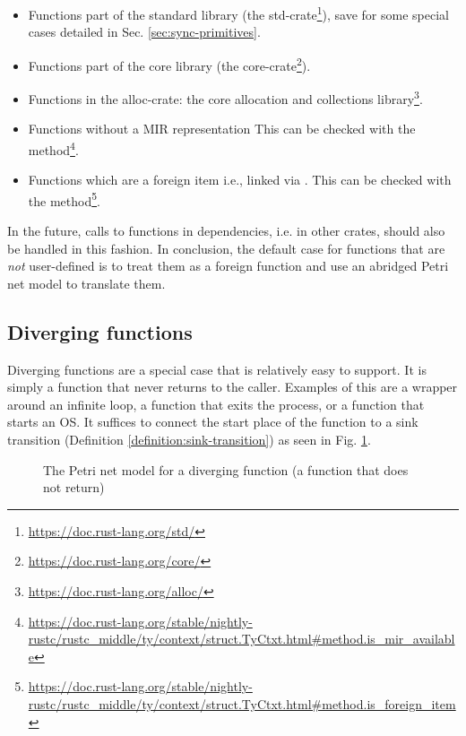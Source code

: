\begin{itemize}
    \item Functions part of the standard library (the std-crate\footnote{\url{https://doc.rust-lang.org/std/}}),
          save for some special cases detailed in Sec. \ref{sec:sync-primitives}.
    \item Functions part of the core library (the core-crate\footnote{\url{https://doc.rust-lang.org/core/}}).
    \item Functions in the alloc-crate: the core allocation and collections library\footnote{\url{https://doc.rust-lang.org/alloc/}}.
    \item Functions without a \acrshort{MIR} representation
          This can be checked with the 
          method\footnote{\url{https://doc.rust-lang.org/stable/nightly-rustc/rustc_middle/ty/context/struct.TyCtxt.html\#method.is\_mir\_available}}.
    \item Functions which are a foreign item i.e., linked via .
          This can be checked with the 
          method\footnote{\url{https://doc.rust-lang.org/stable/nightly-rustc/rustc_middle/ty/context/struct.TyCtxt.html\#method.is\_foreign\_item}}.
\end{itemize}

In the future, calls to functions in dependencies, i.e. in other crates, should also be handled in this fashion.
In conclusion, the default case for functions that are \emph{not} user-defined
is to treat them as a foreign function and use an abridged Petri net model to translate them.

\subsection{Diverging functions}

Diverging functions are a special case that is relatively easy to support.
It is simply a function that never returns to the caller.
Examples of this are a wrapper around an infinite  loop,
a function that exits the process,
or a function that starts an \acrshort{OS}.
It suffices to connect the start place of the function to
a sink transition (Definition \ref{definition:sink-transition})
as seen in Fig. \ref{fig:diverging-function}.

\begin{figure}[!htb]
    \centering
    
    \caption{The Petri net model for a diverging function (a function that does not return)}
    \label{fig:diverging-function}
\end{figure}

